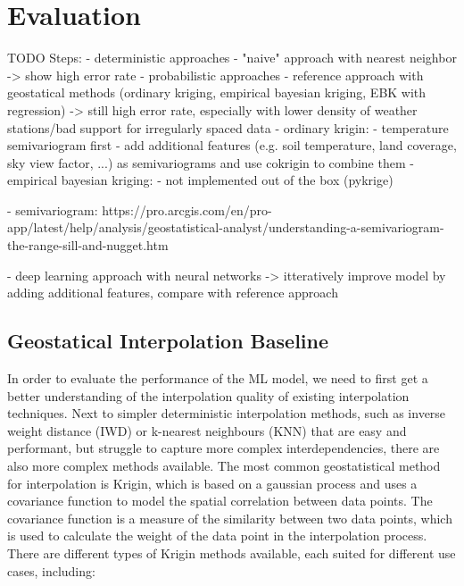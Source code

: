\chapter{Evaluation}
\label{chap:Evaluation}

TODO
Steps:
- deterministic approaches
  - "naive" approach with nearest neighbor -> show high error rate
- probabilistic approaches
  - reference approach with geostatical methods (ordinary kriging, empirical bayesian kriging, EBK with regression) -> still high error rate, especially with lower density of weather stations/bad support for irregularly spaced data
    - ordinary krigin:
        - temperature semivariogram first
        - add additional features (e.g. soil temperature, land coverage, sky view factor, ...) as semivariograms and use cokrigin to combine them
    - empirical bayesian kriging:
        - not implemented out of the box (pykrige)

  - semivariogram: https://pro.arcgis.com/en/pro-app/latest/help/analysis/geostatistical-analyst/understanding-a-semivariogram-the-range-sill-and-nugget.htm

- deep learning approach with neural networks -> itteratively improve model by adding additional features, compare with reference approach

\section{Geostatical Interpolation Baseline}
In order to evaluate the performance of the ML model, we need to first get a better understanding of the interpolation quality of existing interpolation techniques. Next to simpler deterministic interpolation methods, such as inverse weight distance (IWD) or k-nearest neighbours (KNN) that are easy and performant, but struggle to capture more complex interdependencies, there are also more complex methods available. The most common geostatistical method for interpolation is Krigin, which is based on a gaussian process and uses a covariance function to model the spatial correlation between data points. The covariance function is a measure of the similarity between two data points, which is used to calculate the weight of the data point in the interpolation process. There are different types of Krigin methods available, each suited for different use cases, including:


